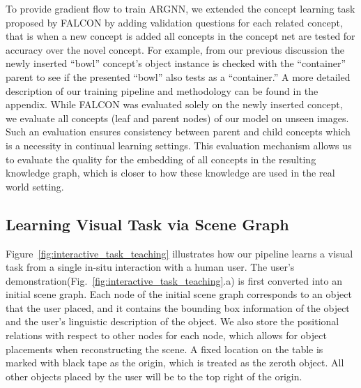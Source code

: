 To provide gradient flow to train ARGNN, we extended the concept learning task proposed by FALCON by adding validation questions for each related concept, that is when a new concept is added all concepts in the concept net are tested for accuracy over the novel concept. For example, from our previous discussion the newly inserted ``bowl'' concept's object instance is checked with the ``container'' parent to see if the presented ``bowl'' also tests as a ``container.''   A more detailed description of our training pipeline and  methodology can be found in the appendix.
While FALCON was evaluated solely on the newly inserted concept, we evaluate all concepts (leaf and parent nodes) of our model on unseen images. Such an evaluation ensures consistency between parent and child concepts which is a necessity in continual learning settings. 
This evaluation mechanism allows us to evaluate the quality for the embedding of all concepts in the resulting knowledge graph, which is closer to how these knowledge are used in the real world setting. 





\subsection{Learning Visual Task via Scene Graph}
Figure~\ref{fig:interactive_task_teaching} illustrates how our pipeline learns a visual task from a single in-situ interaction with a human user.
The user's demonstration(Fig.~\ref{fig:interactive_task_teaching}.a) is first converted  into an initial scene graph.
Each node of the initial scene graph corresponds to an object that the user placed, and it contains the bounding box information of the object and the user's linguistic description of the object.
We also store the positional relations with respect to other nodes for each node, which allows for object placements when reconstructing the scene.
A fixed location on the table is marked with black tape as the origin, which is treated as the zeroth object. All other objects placed by the user will be to the top right of the origin.
%


